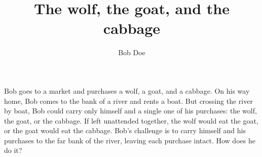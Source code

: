 \documentclass[a4paper,twoside] {article}
\title{The wolf, the goat,\alice[]{Adding the Oxford comma here} and the cabbage}
\author{Bob Doe}
\begin{document}
\maketitle


Bob goes to a market and
purchases a wolf, a goat, and a cabbage. On his way home, Bob comes to
the bank of a river and rents a boat. But crossing the river by boat, Bob
could carry only himself and a single one of his purchases: the wolf, the goat,
or the cabbage.
%
If left unattended together, the wolf would eat the goat, or the goat would eat
the cabbage.
%
Bob's challenge is to carry himself and his purchases to the far bank of
the river, leaving each purchase intact. How does he do it?

\end{document}
